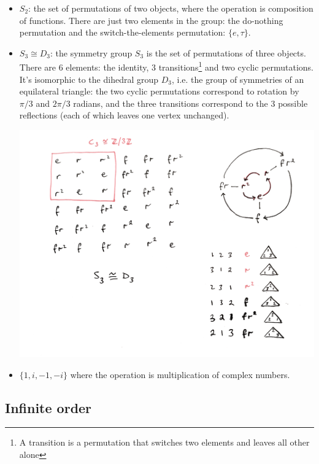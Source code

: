 \begin{itemize}
\item $S_2$: the set of permutations of two objects, where the operation is
  composition of functions.  There are just two elements in the group: the
  do-nothing permutation and the switch-the-elements permutation: $\{e,
  \tau\}$.

\item $S_3 \cong D_3$: the symmetry group $S_3$ is the set of permutations of three objects. There
  are 6 elements: the identity, 3 transitions\footnote{A transition is a permutation that switches
    two elements and leaves all other alone} and two cyclic permutations. It's isomorphic to the
  dihedral group $D_3$, i.e. the group of symmetries of an equilateral triangle: the two cyclic
  permutations correspond to rotation by $\pi/3$ and $2\pi/3$ radians, and the three transitions
  correspond to the 3 possible reflections (each of which leaves one vertex unchanged).
  \begin{mdframed}
    \includegraphics[width=400pt]{img/abstract-algebra-s3-d3.png}
  \end{mdframed}
\item $\{1, i, -1, -i\}$ where the operation is multiplication of complex numbers.
\end{itemize}

\subsection{Infinite order}

